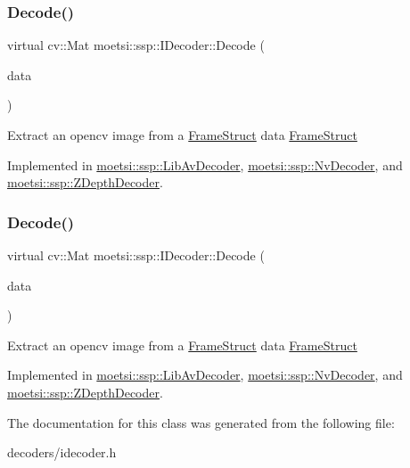 \subsubsection{\texorpdfstring{Decode()}{Decode()}\hspace{0.1cm}{\footnotesize\ttfamily [1/2]}}
{\footnotesize\ttfamily virtual cv\+::\+Mat moetsi\+::ssp\+::\+I\+Decoder\+::\+Decode (\begin{DoxyParamCaption}\item[{\hyperlink{structmoetsi_1_1ssp_1_1FrameStruct}{Frame\+Struct} \&}]{data }\end{DoxyParamCaption})\hspace{0.3cm}{\ttfamily [pure virtual]}}

Extract an opencv image from a \hyperlink{structmoetsi_1_1ssp_1_1FrameStruct}{Frame\+Struct}  data \hyperlink{structmoetsi_1_1ssp_1_1FrameStruct}{Frame\+Struct} 

Implemented in \hyperlink{classmoetsi_1_1ssp_1_1LibAvDecoder_a4206a4581de1b93d6c6a0835e8cf4ac8}{moetsi\+::ssp\+::\+Lib\+Av\+Decoder}, \hyperlink{classmoetsi_1_1ssp_1_1NvDecoder_a78eb894b6825ac5ec57f5a4f4ecd7e31}{moetsi\+::ssp\+::\+Nv\+Decoder}, and \hyperlink{classmoetsi_1_1ssp_1_1ZDepthDecoder_a43226095658d616f7e38df1d43c2f88a}{moetsi\+::ssp\+::\+Z\+Depth\+Decoder}.

\mbox{\label{classmoetsi_1_1ssp_1_1IDecoder_a1c06604dc4107d3668a4e791c13cc063}} 
\subsubsection{\texorpdfstring{Decode()}{Decode()}\hspace{0.1cm}{\footnotesize\ttfamily [2/2]}}
{\footnotesize\ttfamily virtual cv\+::\+Mat moetsi\+::ssp\+::\+I\+Decoder\+::\+Decode (\begin{DoxyParamCaption}\item[{\hyperlink{structmoetsi_1_1ssp_1_1FrameStruct}{Frame\+Struct} \&}]{data }\end{DoxyParamCaption})\hspace{0.3cm}{\ttfamily [pure virtual]}}

Extract an opencv image from a \hyperlink{structmoetsi_1_1ssp_1_1FrameStruct}{Frame\+Struct}  data \hyperlink{structmoetsi_1_1ssp_1_1FrameStruct}{Frame\+Struct} 

Implemented in \hyperlink{classmoetsi_1_1ssp_1_1LibAvDecoder_a4206a4581de1b93d6c6a0835e8cf4ac8}{moetsi\+::ssp\+::\+Lib\+Av\+Decoder}, \hyperlink{classmoetsi_1_1ssp_1_1NvDecoder_a78eb894b6825ac5ec57f5a4f4ecd7e31}{moetsi\+::ssp\+::\+Nv\+Decoder}, and \hyperlink{classmoetsi_1_1ssp_1_1ZDepthDecoder_a43226095658d616f7e38df1d43c2f88a}{moetsi\+::ssp\+::\+Z\+Depth\+Decoder}.



The documentation for this class was generated from the following file\+:\begin{DoxyCompactItemize}
\item 
decoders/idecoder.\+h\end{DoxyCompactItemize}
